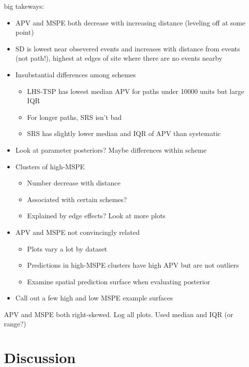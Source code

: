 \documentclass[review]{elsarticle}
\begin{document}
big takeways:
\begin{itemize}
\item APV and MSPE both decrease with increasing distance (leveling off at
some point)
\item SD is lowest near obsevered events and increases with distance from
events (not path!), highest at edges of site where there are no events nearby
\item Insubstantial differences among schemes
\begin{itemize}
\item LHS-TSP has lowest median APV for paths under 10000 units but large IQR
\item For longer paths, SRS isn't bad
\item SRS has slightly lower  median and IQR of APV than systematic
\end{itemize}
\item Look at parameter posteriors? Maybe differences within scheme
\item Clusters of high-MSPE
\begin{itemize}
\item Number decrease with distance
\item Associated with certain schemes?
\item Explained by edge effects? Look at more plots
\end{itemize}
\item APV and MSPE not convincingly related
\begin{itemize}
\item Plots vary a lot by dataset
\item Predictions in high-MSPE clusters have high APV but are not outliers
\item Examine spatial prediction surface when evaluating posterior
\end{itemize}
\item Call out a few high and low MSPE example surfaces
\end{itemize}
APV and MSPE both right-skewed. Log all plots. Used median and IQR (or range?)


\section{Discussion}
\end{document}

